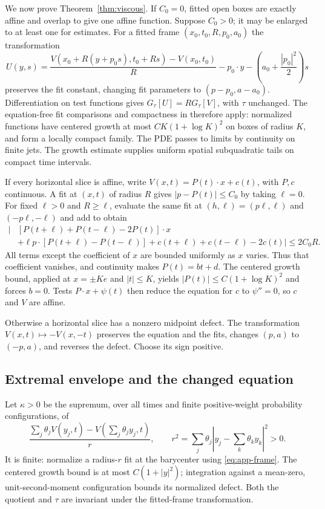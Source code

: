 We now prove Theorem~\ref{thm:viscous}. If $C_0=0$, fitted open boxes
are exactly affine and overlap to give one affine function. Suppose
$C_0>0$; it may be enlarged to at least one for estimates.
For a fitted frame $(x_0,t_0,R,p_0,a_0)$ the transformation
\begin{equation}\label{eq:app-frame}
 U(y,s)=\frac{V(x_0+R(y+p_0s),t_0+Rs)-V(x_0,t_0)}R
        -p_0\cdot y-\left(a_0+\frac{|p_0|^2}{2}\right)s
\end{equation}
preserves the fit constant, changing fit parameters to
$(p-p_0,a-a_0)$. Differentiation on test functions gives
$G_\tau[U]=R G_\tau[V]$, with $\tau$ unchanged. The equation-free
fit comparisons and compactness in \cite[Section 4]{OpenAI} therefore
apply: normalized functions have centered growth at most
$CK(1+\log K)^2$ on boxes of radius $K$, and form a locally compact
family. The PDE passes to limits by continuity on finite jets.
The growth estimate supplies uniform spatial subquadratic tails on
compact time intervals.

If every horizontal slice is affine, write
$V(x,t)=P(t)\cdot x+c(t)$, with $P,c$ continuous. A fit at $(x,t)$
of radius $R$ gives $|p-P(t)|\leq C_0$ by taking $\ell=0$. For fixed
$\ell>0$ and $R\geq\ell$, evaluate the same fit at
$(h,\ell)=(p\ell,\ell)$ and $(-p\ell,-\ell)$ and add to obtain
\[
 \begin{split}
 \big|&[P(t+\ell)+P(t-\ell)-2P(t)]\cdot x\\
 &+\ell p\cdot[P(t+\ell)-P(t-\ell)]
      +c(t+\ell)+c(t-\ell)-2c(t)\big|\leq2C_0R.
 \end{split}
\]
All terms except the coefficient of $x$ are bounded uniformly as $x$
varies. Thus that coefficient vanishes, and continuity makes
$P(t)=bt+d$. The centered growth bound, applied at $x=\pm Ke$ and
$|t|\leq K$, yields $|P(t)|\leq C(1+\log K)^2$ and forces $b=0$.
Tests $P\cdot x+\psi(t)$ then reduce the equation for $c$ to
$\psi''=0$, so $c$ and $V$ are affine.

Otherwise a horizontal slice has a nonzero midpoint defect. The
transformation $V(x,t)\mapsto-V(x,-t)$ preserves the equation and
the fits, changes $(p,a)$ to $(-p,a)$, and reverses the defect. Choose
its sign positive.

\subsection{Extremal envelope and the changed equation}

Let $\kappa>0$ be the supremum, over all times and finite
positive-weight probability configurations, of
\[
 \frac{\sum_j\theta_jV(y_j,t)-V(\sum_j\theta_jy_j,t)}r,
 \qquad
 r^2=\sum_j\theta_j\left|y_j-\sum_k\theta_ky_k\right|^2>0.
\]
It is finite: normalize a radius-$r$ fit at the barycenter using
\eqref{eq:app-frame}. The centered growth bound is at most
$C(1+|y|^2)$; integration against a mean-zero, unit-second-moment
configuration bounds its normalized defect. Both the quotient and
$\tau$ are invariant under the fitted-frame transformation.

